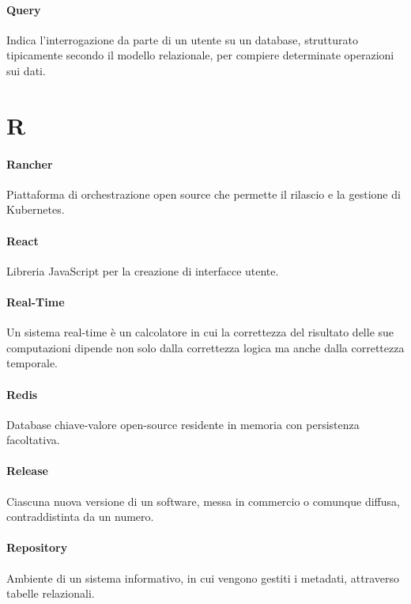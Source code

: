 \documentclass[]{article}
\begin{document}
	\paragraph*{Query}
	Indica l'interrogazione da parte di un utente su un database, strutturato tipicamente secondo il modello relazionale, per compiere determinate operazioni sui dati.

	\newpage

	\section*{R}

	\paragraph*{Rancher}
	Piattaforma di orchestrazione open source che permette il rilascio e la gestione di Kubernetes.

	\paragraph*{React}
	Libreria JavaScript per la creazione di interfacce utente.

	\paragraph*{Real-Time}
	Un sistema real-time è un calcolatore in cui la correttezza del risultato delle sue computazioni dipende non solo dalla correttezza logica ma anche dalla correttezza temporale.

    \paragraph*{Redis}
    Database chiave-valore open-source residente in memoria con persistenza facoltativa.

	\paragraph*{Release}
	Ciascuna nuova versione di un software, messa in commercio o comunque diffusa, contraddistinta da un numero.

	\paragraph*{Repository}
	Ambiente di un sistema informativo, in cui vengono gestiti i metadati, attraverso tabelle relazionali.
\end{document}
